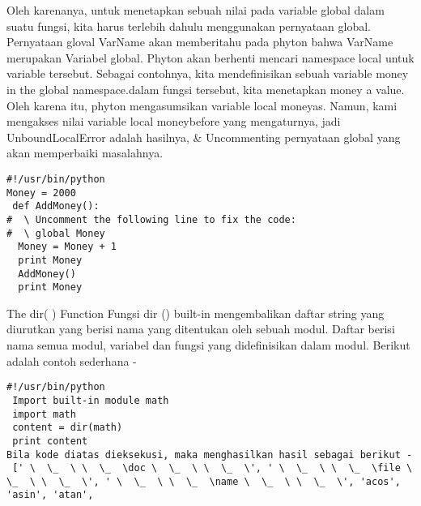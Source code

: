 Oleh karenanya, untuk menetapkan sebuah nilai pada variable global dalam suatu fungsi, kita harus terlebih dahulu menggunakan pernyataan global. Pernyataan gloval VarName akan memberitahu pada phyton bahwa VarName merupakan Variabel global. Phyton akan berhenti mencari namespace local untuk variable tersebut.
Sebagai contohnya, kita mendefinisikan sebuah variable money in the global namespace.dalam fungsi tersebut, kita menetapkan money a value. Oleh karena itu, phyton mengasumsikan variable local moneyas. Namun, kami mengakses nilai variable local moneybefore yang mengaturnya, jadi UnboundLocalError adalah hasilnya, \& Uncommenting pernyataan global yang akan memperbaiki masalahnya.
 
\begin{verbatim}
#!/usr/bin/python  
Money = 2000  
 def AddMoney():  
#  \ Uncomment the following line to fix the code:  
#  \ global Money  
  Money = Money + 1  
  print Money  
  AddMoney() 
  print Money
 \end{verbatim}
The dir( ) Function  
Fungsi dir () built-in mengembalikan daftar string yang diurutkan yang berisi nama yang ditentukan oleh sebuah modul. 
Daftar berisi nama semua modul, variabel dan fungsi yang didefinisikan dalam modul. Berikut adalah contoh sederhana - 
\begin{verbatim}
#!/usr/bin/python 
 Import built-in module math  
 import math  
 content = dir(math) 
 print content 
Bila kode diatas dieksekusi, maka menghasilkan hasil sebagai berikut - 
 [' \  \_  \ \  \_  \doc \  \_  \ \  \_  \', ' \  \_  \ \  \_  \file \  \_  \ \  \_  \', ' \  \_  \ \  \_  \name \  \_  \ \  \_  \', 'acos', 'asin', 'atan',
 \end{verbatim}
 
